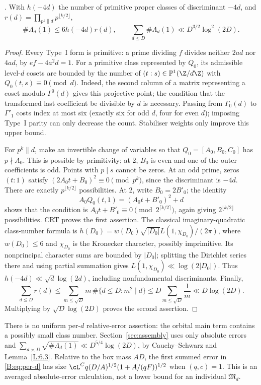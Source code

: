 \begin{lemma}\label{L:6.3}
. With \(h(-4d)\) the number of primitive proper classes
of discriminant \(-4d\), and
\(r(d)=\prod_{p^k\parallel d}p^{\lfloor k/2\rfloor}\),
\[
 \#\Lambda_d(1)\le6h(-4d)r(d),\qquad
 \sum_{d\le D}\#\Lambda_d(1)\ll D^{3/2}\log^2(2D).
\]
\end{lemma}
\begin{proof}
Every Type~I form is primitive: a prime dividing \(f\) divides neither
\(2ad\) nor \(4ad\), by \(ef-4a^2d=1\).
For a primitive class represented by \(Q_0\), its admissible level-\(d\)
cosets are bounded by the number of
\((t:s)\in\mathbb P^1(\Z/d\Z)\) with \(Q_0(t,s)\equiv0\pmod d\).
Indeed, the second column of a matrix representing a coset modulo
\(\Gamma^0(d)\) gives this projective point; the condition that the
transformed last coefficient be divisible by \(d\) is necessary.
Passing from \(\Gamma_0(d)\) to \(\Gamma'_1\) costs index at most six
(exactly six for odd \(d\), four for even \(d\)); imposing Type~I parity
can only decrease the count. Stabiliser weights only improve this upper bound.

For \(p^k\parallel d\), make an invertible change of variables so that
\(Q_0=[A_0,B_0,C_0]\) has \(p\nmid A_0\). This is possible by primitivity;
at 2, \(B_0\) is even and one of the outer coefficients is odd.
Points with \(p\mid s\) cannot be zeros. At an odd prime, zeros
\((t:1)\) satisfy
\((2A_0t+B_0)^2\equiv0\pmod{p^k}\), since the discriminant is \(-4d\).
There are exactly \(p^{\lfloor k/2\rfloor}\) possibilities.
At 2, write \(B_0=2B'_0\); the identity
\[
 A_0Q_0(t,1)=(A_0t+B'_0)^2+d
\]
shows that the condition is
\(A_0t+B'_0\equiv0\pmod{2^{\lceil k/2\rceil}}\), again giving
\(2^{\lfloor k/2\rfloor}\) possibilities. CRT proves the first assertion.
The classical imaginary-quadratic class-number formula
\cite{IK} is
\(h(D_0)=w(D_0)\sqrt{|D_0|}L(1,\chi_{D_0})/(2\pi)\),
where \(w(D_0)\le6\) and \(\chi_{D_0}\) is the Kronecker character,
possibly imprimitive. Its nonprincipal character sums are bounded by
\(|D_0|\); splitting the Dirichlet series there and using partial
summation gives \(L(1,\chi_{D_0})\ll\log(2|D_0|)\).
Thus \(h(-4d)\ll\sqrt d\log(2d)\), including nonfundamental discriminants.
Finally,
\[
 \sum_{d\le D}r(d)
 \le\sum_{m\le\sqrt D}m\,\#\{d\le D:m^2\mid d\}
 \le D\sum_{m\le\sqrt D}\frac1m\ll D\log(2D).
\]
Multiplying by \(\sqrt D\log(2D)\) proves the second assertion.
\end{proof}

There is no uniform per-\(d\) relative-error assertion: the orbital
main term contains a possibly small class number. Section~\ref{sec:assembly}
uses only absolute errors and
\(\sum_{d\asymp D}\sqrt{\#\Lambda_d(1)}\ll D^{5/4}\log(2D)\),
by Cauchy--Schwarz and Lemma~\ref{L:6.3}. Relative to the box mass
\(AD\), the first summed error in \eqref{B:eq:per-d} has size
\(\cL^Cq(D/A)^{1/2}(1+A/(qF))^{1/2}\) when \((q,c)=1\).
This is an averaged absolute-error calculation, not a lower bound for
an individual \(\mathfrak M_d\).
